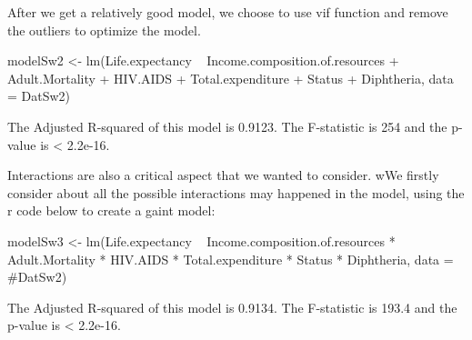 
After we get a relatively good model, we choose to use vif function and remove the outliers to optimize the model.

modelSw2 <- lm(Life.expectancy ~ Income.composition.of.resources + Adult.Mortality + HIV.AIDS + Total.expenditure + Status + Diphtheria, data = DatSw2)

The Adjusted R-squared of this model is 0.9123. The F-statistic is 254 and the p-value is < 2.2e-16.


Interactions are also a critical aspect that we wanted to consider. wWe firstly consider about all the possible interactions may happened in the model, using the r code below to create a gaint model:

modelSw3 <- lm(Life.expectancy ~ Income.composition.of.resources * Adult.Mortality * HIV.AIDS * Total.expenditure * Status * Diphtheria, data = #DatSw2)

The Adjusted R-squared of this model is 0.9134. The F-statistic is 193.4 and the p-value is < 2.2e-16.

